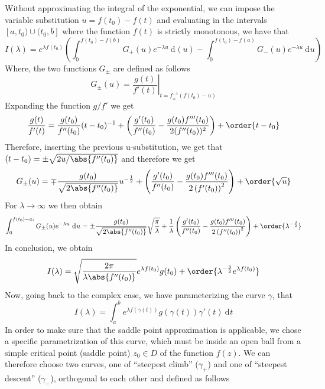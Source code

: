 \documentclass[a4paper, 11pt]{book}
\newcommand{\1}{\opr{\mathds{1}}}
\newcommand{\diff}[2][]{\ \mathrm{d}^{#1}#2}
\theoremstyle{plain}
\begin{document}
	Without approximating the integral of the exponential, we can impose the variable substitution $u=f(t_0)-f(t)$ and evaluating in the intervals $[a,t_0)\cup(t_0,b]$ where the function $f(t)$ is strictly monotonous, we have that
	\begin{equation}
		I(\lambda)=e^{\lambda f(t_0)}\left( \int_{0}^{f(t_0)-f(b)}G_+(u)e^{-\lambda u}\diff(u)-\int_{0}^{f(t_0)-f(a)}G_{-}(u)e^{-\lambda u}\diff{u} \right)
		\label{eq:integralnewsub}
	\end{equation}
	Where, the two functions $G_{\pm}$ are defined as follows
	\begin{equation*}
		G_{\pm}(u)=\left.\frac{g(t)}{f'(t)}\right|_{t=f^{-1}_{\pm}(f(t_0)-u)}
	\end{equation*}
	Expanding the function $g/f'$ we get
	\begin{equation}
		\frac{g(t)}{f'(t)}=\frac{g(t_0)}{f''(t_0)}(t-t_0)^{-1}+\left( \frac{g'(t_0)}{f''(t_0)}-\frac{g(t_0)f'''(t_0)}{2(f''(t_0))^2} \right)+\order{t-t_0}
		\label{eq:taylorg/f'}
	\end{equation}
	Therefore, inserting the previous u-substitution, we get that $(t-t_0)=\pm\sqrt{2u/\abs{f''(t_0)}}$ and therefore we get
	\begin{equation}
		G_{\pm}(u)=\mp\frac{g(t_0)}{\sqrt{2\abs{f''(t_0)}}}u^{-\frac{1}{2}}+\left( \frac{g'(t_0)}{f''(t_0)}-\frac{g(t_0)f'''(t_0)}{2\left( f'(t_0) \right)^2} \right)+\order{\sqrt{u}}
		\label{eq:Gpmtaylor}
	\end{equation}
	For $\lambda\to\infty$ we then obtain
	\begin{equation}
		\int_{0}^{f(t_0)-a_i}G_{\pm}(u)e^{-\lambda u}\diff{u}=\pm\frac{g(t_0)}{\sqrt{2\abs{f''(t_0)}}}\sqrt{\frac{\pi}{\lambda}}+\frac{1}{\lambda}\left( \frac{g'(t_0)}{f''(t_0)}-\frac{g(t_0)f'''(t_0)}{2\left( f''(t_0) \right)^2} \right)+\order{\lambda^{-\frac{3}{2}}}
		\label{eq:gpmintegral}
	\end{equation}
	In conclusion, we obtain
	\begin{equation}
		I(\lambda)=\sqrt{\frac{2\pi}{\lambda\abs{f''(t_0)}}}e^{\lambda f(t_0)}g(t_0)+\order{\lambda^{-\frac{3}{2}}e^{\lambda f(t_0)}}
		\label{eq:completeIlambda}
	\end{equation}
	Now, going back to the complex case, we have parameterizing the curve $\gamma$, that
	\begin{equation}
		I(\lambda)=\int_{a}^{b}e^{\lambda f(\gamma(t))}g(\gamma(t))\gamma'(t)\diff{t}
		\label{eq:Ilambdacomplexpar}
	\end{equation}
	In order to make sure that the saddle point approximation is applicable, we chose a specific parametrization of this curve, which must be inside an open ball from a simple critical point (saddle point) $z_0\in D$ of the function $f(z)$. We can therefore choose two curves, one of ``steepest climb'' ($\gamma_+$) and one of ``steepest descent'' ($\gamma_-$), orthogonal to each other and defined as follows
\end{document}
